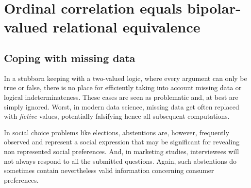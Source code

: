 \chapter[Ordinal Correlation]{Ordinal correlation equals bipolar-valued relational equivalence}
\label{sec:16}

\abstract*{}

\abstract{}

\section{Coping with missing data}
\label{sec:16.1}

In a stubborn keeping with a two-valued logic, where every argument can only be true or false, there is no place for efficiently taking into account missing data or logical indeterminateness. These cases are seen as problematic and, at best are simply ignored. Worst, in modern data science, missing data get often replaced with \emph{fictive} values, potentially falsifying hence all subsequent computations.

In social choice problems like elections, abstentions are, however, frequently observed and represent a social expression that may be significant for revealing non represented social preferences. And, in marketing studies, interviewees will not always respond to all the submitted questions. Again, such abstentions do sometimes contain nevertheless valid information concerning consumer preferences.

